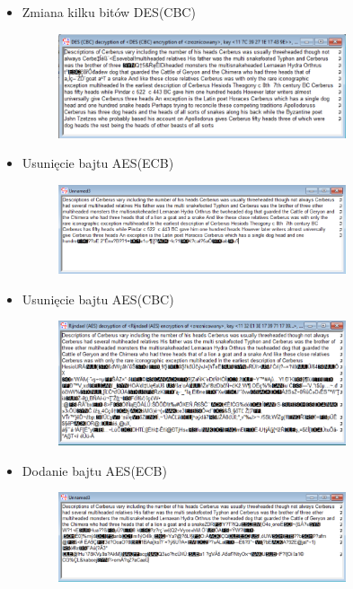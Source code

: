 \documentclass{article}
\begin{document}
\begin{itemize}
\begin{figure}[H]
    \end{figure}
    \item Zmiana kilku bitów DES(CBC)
    \begin{figure}[H]
        \centering
        \includegraphics[width=0.8\textwidth]{zmiana_kilku_bitow_cbc.png}
    \end{figure}
    \item Usunięcie bajtu AES(ECB)
    \begin{figure}[H]
        \centering
        \includegraphics[width=0.8\textwidth]{usuniecie_ecb.png}
    \end{figure}
    \item Usunięcie bajtu AES(CBC)
    \begin{figure}[H]
        \centering
        \includegraphics[width=0.8\textwidth]{usuniecie_cbc.png}
    \end{figure}
    \item Dodanie bajtu AES(ECB)
    \begin{figure}[H]
        \centering
        \includegraphics[width=0.8\textwidth]{dodanie_ecb.png}

\end{figure}
\end{itemize}
\end{document}
